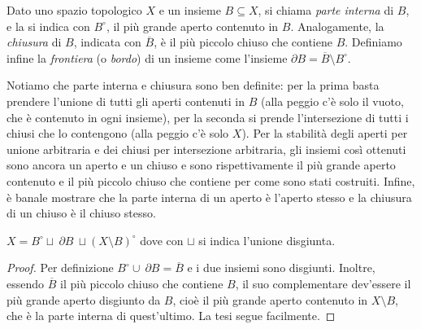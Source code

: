 \begin{defn}
	Dato uno spazio topologico $X$ e un insieme $B \subseteq X$, si chiama
	\textit{parte interna} di $B$, e la si indica con $B^{\circ}$, il più grande
	aperto contenuto in $B$. Analogamente, la \textit{chiusura} di $B$, indicata
	con $\overline{B}$, è il più piccolo chiuso che contiene $B$. Definiamo
	infine la \textit{frontiera} (o \textit{bordo}) di un insieme come l'insieme
	$\partial B= \overline{B} \setminus B^{\circ}$.
\end{defn}

Notiamo che parte interna e chiusura sono ben definite: per la prima basta
prendere l'unione di tutti gli aperti contenuti in $B$ (alla peggio c'è solo il
vuoto, che è contenuto in ogni insieme), per la seconda si prende l'intersezione
di tutti i chiusi che lo contengono (alla peggio c'è solo $X$). Per la stabilità
degli aperti per unione arbitraria e dei chiusi per intersezione arbitraria, gli
insiemi così ottenuti sono ancora un aperto e un chiuso e sono rispettivamente
il più grande aperto contenuto e il più piccolo chiuso che contiene per come
sono stati costruiti. Infine, è banale mostrare che la parte interna di un
aperto è l'aperto stesso e la chiusura di un chiuso è il chiuso stesso.

\begin{ftt}
	$X= B^{\circ} \sqcup\ \partial B\ \sqcup (X
	\setminus B)^{\circ}$ dove con $\sqcup$ si indica l'unione disgiunta.
\end{ftt}

\begin{proof}
	Per definizione $B^{\circ} \cup\ \partial B=\overline{B}$ e i due insiemi
	sono disgiunti. Inoltre, essendo $\overline B$ il più piccolo chiuso che
	contiene $B$, il suo complementare dev'essere il più grande aperto disgiunto
	da $B$, cioè il più grande aperto contenuto in $X \setminus B$, che è la
	parte interna di quest'ultimo. La tesi segue facilmente.
\end{proof}
